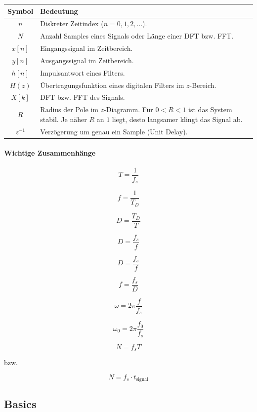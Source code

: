\vspace{0.3em}

\begin{center}
	\renewcommand{\arraystretch}{1.2}
	\small
	\begin{tabularx}{\columnwidth}{|c|X|}
		\hline
		\textbf{Symbol} & \textbf{Bedeutung} \\ \hline
		$n$ & Diskreter Zeitindex ($n=0,1,2,\ldots$). \\ \hline
		$N$ & Anzahl Samples eines Signals oder Länge einer DFT bzw. FFT. \\ \hline
		$x[n]$ & Eingangssignal im Zeitbereich. \\ \hline
		$y[n]$ & Ausgangssignal im Zeitbereich. \\ \hline
		$h[n]$ & Impulsantwort eines Filters. \\ \hline
		$H(z)$ & Übertragungsfunktion eines digitalen Filters im $z$-Bereich. \\ \hline
		$X[k]$ & DFT bzw. FFT des Signals. \\ \hline
		$R$ & Radius der Pole im $z$-Diagramm. Für $0<R<1$ ist das System stabil. Je näher $R$ an $1$ liegt, desto langsamer klingt das Signal ab. \\ \hline
		$z^{-1}$ & Verzögerung um genau ein Sample (Unit Delay). \\ \hline
	\end{tabularx}
\end{center}

\paragraph{Wichtige Zusammenhänge}

\[
T=\frac{1}{f_s}
\]

\[
f=\frac{1}{T_D}
\]

\[
D=\frac{T_D}{T}
\]

\[
D=\frac{f_s}{f}
\]

\[
D=\frac{f_s}{f}
\]

\[
f=\frac{f_s}{D}
\]

\[
\omega=2\pi\frac{f}{f_s}
\]

\[
\omega_0=2\pi\frac{f_0}{f_s}
\]

\[
N=f_sT
\]

bzw.

\[
N=f_s\cdot t_{\text{signal}}
\]

\subsection{Basics}

